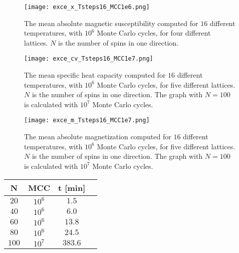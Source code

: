 \documentclass[12pt]{article}
\begin{document}
\begin{flushleft}
\begin{figure}[!h]
\begin{center}
\texttt{[image: exce\_x\_Tsteps16\_MCC1e6.png]}
\caption{\label{fig:m_1e6}The mean absolute magnetic susceptibility computed for $16$ different temperatures, with $10^6$ Monte Carlo cycles, for four different lattices. $N$ is the number of spins in one direction.}
\end{center}
\end{figure}

\begin{figure}[!h]
\begin{center}
\texttt{[image: exce\_cv\_Tsteps16\_MCC1e7.png]}
\caption{\label{fig:cv_1e7}The mean specific heat capacity computed for $16$ different temperatures, with $10^6$ Monte Carlo cycles, for five different lattices. $N$ is the number of spins in one direction. The graph with $N=100$ is calculated with $10^7$ Monte Carlo cycles.}
\end{center}
\end{figure}

\begin{figure}[!h]
\begin{center}
\texttt{[image: exce\_m\_Tsteps16\_MCC1e7.png]}
\caption{\label{fig:m_1e7}The mean absolute magnetization computed for $16$ different temperatures, with $10^6$ Monte Carlo cycles, for five different lattices. $N$ is the number of spins in one direction. The graph with $N=100$ is calculated with $10^7$ Monte Carlo cycles.}
\end{center}
\end{figure}


\newpage
\begin{table}[!h]
\begin{center}
\begin{tabular}{| c | c | c | c |}
	\hline
	 \textbf{N} & \textbf{MCC} & \textbf{t [min]}\\
	\hline	
	 $20$ & $10^6$ & $1.5$\\
	 $40$ & $10^6$ & $6.0$\\
	 $60$ & $10^6$ & $13.8$\\
	 $80$ & $10^6$ & $24.5$\\
	 $100$ & $10^7$ & $383.6$\\


\end{tabular}
\end{center}
\end{table}
\end{flushleft}
\end{document}
